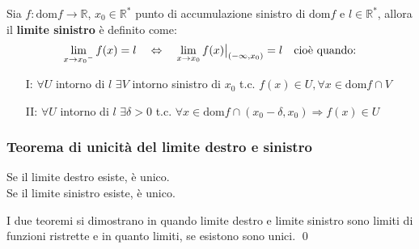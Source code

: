 \documentclass[a4paper]{article}
\newcommand\restr[2]{{%
	\left.\kern-\nulldelimiterspace %
	#1 %
	\vphantom{\big|} %
	\right|_{#2} %
	}}
\newcommand\dom{\text{dom}}
\begin{document}
Sia \(f: \dom f \to \mathbb{R}\), \(x_0 \in \mathbb{R}^*\) punto di accumulazione sinistro di \(\dom f\) e \(l \in \mathbb{R}^*\), allora il \textbf{limite sinistro} è definito come:
\[\lim_{x \to {x_0}^-} f(x) = l \quad \Leftrightarrow \quad \lim_{x \to {x_0}} \restr{f(x)}{\left( - \infty, x_0 \right)} = l \quad \text{cioè quando:}\]
\begin{itemize}
	\item[I: ] \(\forall U\) intorno di \(l\) \(\exists V\) intorno sinistro di \(x_0\) t.c. \(f(x) \in U, \forall x \in \dom f \cap V\)
	\item[II: ] \(\forall U\) intorno di \(l\) \(\exists \delta > 0\) t.c. \(\forall x \in \dom f \cap \left( x_0 - \delta, x_0 \right) \Rightarrow f(x) \in U\)
\end{itemize}

\subsubsection*{Teorema di unicità del limite destro e sinistro}
Se il limite destro esiste, è unico. \\
Se il limite sinistro esiste, è unico. 

I due teoremi si dimostrano in quando limite destro e limite sinistro sono limiti di funzioni ristrette e in quanto limiti, se esistono sono unici. \qed
\end{document}
